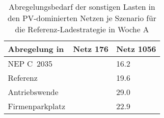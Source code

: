 {
\renewcommand{\arraystretch}{1.2}%
\begin{table}[H]
	\begin{center}
		\caption{Abregelungsbedarf der sonstigen Lasten in den PV-dominierten Netzen je Szenario für die Referenz-Ladestrategie in Woche A}
		\begin{tabu} to 0.6\textwidth {X[1.5] X[1, r] X[1, r]}
			\toprule
			Abregelung in \si{\mwh} & Netz \num{176} & Netz \num{1056} \\ \midrule
			NEP C~\num{2035}                          &                & \num{16.2}      \\
			Referenz                                  &                & \num{19.6}      \\
			Antriebswende                             &                & \num{29.0}      \\
			\glqq Firmenparkplatz\grqq{}              &                & \num{22.9}      \\ \bottomrule
		\end{tabu}
		\label{tab:pv_dominated_week_a_load_cur}
	\end{center}
	\vspace{-3mm}%
\end{table}
}